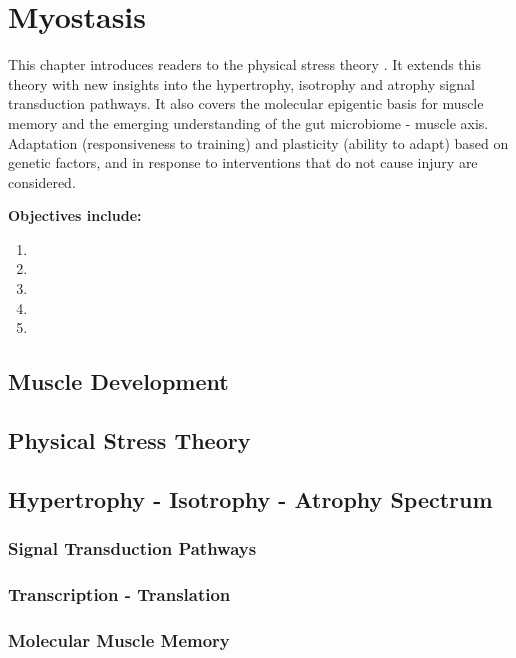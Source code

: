 \chapter{Myostasis}\label{chp:myostasis}

\minitoc
This chapter introduces readers to the physical stress theory \cite{mueller_tissue_2002}. It extends this theory with new insights into the hypertrophy, isotrophy and atrophy signal transduction pathways. It also covers the molecular epigentic basis for muscle memory and the emerging understanding of the gut microbiome - muscle axis. Adaptation (responsiveness to training) and plasticity (ability to adapt) based on genetic factors, and in response to interventions that do not cause injury are considered.

\vspace{5mm}

\textbf{Objectives include:}
\begin{enumerate}
    \item
    \item
    \item
    \item
    \item
\end{enumerate}

\section{Muscle Development}

\section{Physical Stress Theory}

\section{Hypertrophy - Isotrophy - Atrophy Spectrum}

\subsection{Signal Transduction Pathways}

\subsection{Transcription - Translation}

\subsection{Molecular Muscle Memory}

